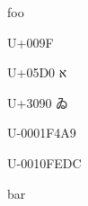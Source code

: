 \documentclass{article}%
\begin{document}
foo

U+009F 

U+05D0 א

U+3090 ゐ

U-0001F4A9 💩

U-0010FEDC 􏻜

bar
\end{document}
